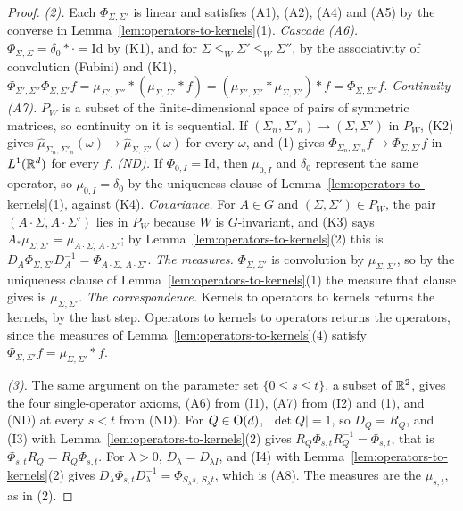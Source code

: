 \begin{proof}
\emph{(2).} Each $\Phi_{\Sigma,\Sigma'}$ is linear and satisfies (A1), (A2), (A4) and (A5) by the
converse in Lemma~\ref{lem:operators-to-kernels}(1). \emph{Cascade (A6).} $\Phi_{\Sigma,\Sigma} = \delta_0 * \cdot
= \mathrm{Id}$ by (K1), and for $\Sigma \le_W \Sigma' \le_W \Sigma''$, by the associativity of
convolution (Fubini) and (K1),
$\Phi_{\Sigma',\Sigma''}\Phi_{\Sigma,\Sigma'}f = \mu_{\Sigma',\Sigma''} * (\mu_{\Sigma,\Sigma'} * f)
= (\mu_{\Sigma',\Sigma''} * \mu_{\Sigma,\Sigma'}) * f = \Phi_{\Sigma,\Sigma''}f$.
\emph{Continuity (A7).} $P_W$ is a subset of the finite-dimensional space of pairs of symmetric matrices,
so continuity on it is sequential. If $(\Sigma_n,\Sigma'_n) \to (\Sigma,\Sigma')$ in $P_W$, (K2) gives
$\widehat\mu_{\Sigma_n,\Sigma'_n}(\omega) \to \widehat\mu_{\Sigma,\Sigma'}(\omega)$ for every $\omega$,
and (1) gives $\Phi_{\Sigma_n,\Sigma'_n}f \to \Phi_{\Sigma,\Sigma'}f$ in $L^1(\mathbb{R}^d)$ for every $f$.
\emph{(ND).} If $\Phi_{0,I} = \mathrm{Id}$, then $\mu_{0,I}$ and $\delta_0$ represent the same
operator, so $\mu_{0,I} = \delta_0$ by the uniqueness clause of Lemma~\ref{lem:operators-to-kernels}(1),
against (K4). \emph{Covariance.} For $A \in G$ and $(\Sigma,\Sigma') \in P_W$, the pair
$(A\cdot\Sigma, A\cdot\Sigma')$ lies in $P_W$ because $W$ is $G$-invariant, and (K3) says
$A_*\mu_{\Sigma,\Sigma'} = \mu_{A\cdot\Sigma,\,A\cdot\Sigma'}$; by Lemma~\ref{lem:operators-to-kernels}(2)
this is $D_A\Phi_{\Sigma,\Sigma'}D_A^{-1} = \Phi_{A\cdot\Sigma,\,A\cdot\Sigma'}$. \emph{The measures.}
$\Phi_{\Sigma,\Sigma'}$ is convolution by $\mu_{\Sigma,\Sigma'}$, so by the uniqueness clause of
Lemma~\ref{lem:operators-to-kernels}(1) the measure that clause gives is $\mu_{\Sigma,\Sigma'}$. \emph{The
correspondence.} Kernels to operators to kernels returns the kernels, by the last step. Operators to
kernels to operators returns the operators, since the measures of
Lemma~\ref{lem:operators-to-kernels}(4) satisfy $\Phi_{\Sigma,\Sigma'}f = \mu_{\Sigma,\Sigma'} * f$.

\emph{(3).} The same argument on the parameter set $\{0 \le s \le t\}$, a subset of $\mathbb{R}^2$, gives the
four single-operator axioms, (A6) from (I1), (A7) from (I2) and (1), and (ND) at every $s < t$ from
(ND). For $Q \in \mathrm{O}(d)$, $|\det Q| = 1$, so $D_Q = R_Q$, and (I3) with
Lemma~\ref{lem:operators-to-kernels}(2) gives $R_Q\Phi_{s,t}R_Q^{-1} = \Phi_{s,t}$, that is
$\Phi_{s,t}R_Q = R_Q\Phi_{s,t}$. For $\lambda > 0$, $D_\lambda = D_{\lambda I}$, and (I4) with
Lemma~\ref{lem:operators-to-kernels}(2) gives $D_\lambda\Phi_{s,t}D_\lambda^{-1} =
\Phi_{S_\lambda s,\,S_\lambda t}$, which is (A8). The measures are the $\mu_{s,t}$, as in (2).
\end{proof}

